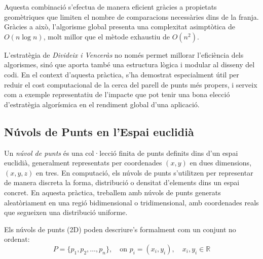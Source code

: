\documentclass{ieeetj}
\begin{document}
Aquesta combinació s’efectua de manera eficient gràcies a propietats geomètriques que limiten el nombre de comparacions necessàries dins de la franja. Gràcies a això, l’algorisme global presenta una complexitat asimptòtica de \(O(n \log n)\), molt millor que el mètode exhaustiu de \(O(n^2)\).

L’estratègia de \textit{Divideix i Venceràs} no només permet millorar l’eficiència dels algorismes, sinó que aporta també una estructura lògica i modular al disseny del codi. En el context d’aquesta pràctica, s’ha demostrat especialment útil per reduir el cost computacional de la cerca del parell de punts més propers, i serveix com a exemple representatiu de l’impacte que pot tenir una bona elecció d’estratègia algorísmica en el rendiment global d’una aplicació.

\subsection{Núvols de Punts en l'Espai euclidià}

Un \textit{núvol de punts} és una col·lecció finita de punts definits dins d’un espai euclidià, generalment representats per coordenades \((x, y)\) en dues dimensions, \((x, y, z)\) en tres. En computació, els núvols de punts s’utilitzen per representar de manera discreta la forma, distribució o densitat d’elements dins un espai concret. En aquesta pràctica, treballem amb núvols de punts generats aleatòriament en una regió bidimensional o tridimensional, amb coordenades reals que segueixen una distribució uniforme.

Els núvols de punts (2D) poden descriure’s formalment com un conjunt no ordenat:
\[
P = \{p_1, p_2, \ldots, p_n\}, \quad \text{on } p_i = (x_i, y_i), \quad x_i, y_i \in \mathbb{R}
\]
\end{document}
